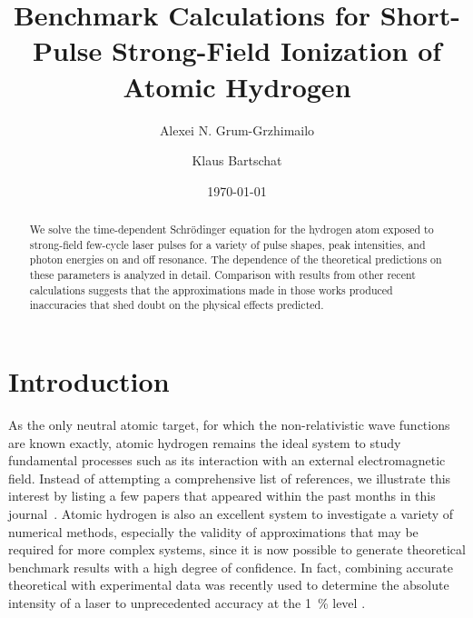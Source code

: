 \documentclass[12pt,aps,pra,amsmath,amssymb,showpacs,twocolumn,preprintnumbers,
floatfix,letterpaper]{revtex4-1}
\begin{document}

\author{Alexei N. Grum-Grzhimailo}

\author{Klaus Bartschat}

\date{\today}

\title{Benchmark Calculations for Short-Pulse Strong-Field Ionization of Atomic Hydrogen}

\begin{abstract}


We solve the time-dependent Schr\"odinger equation for the hydrogen atom exposed to strong-field few-cycle
laser pulses for a variety of pulse shapes, peak intensities, and photon energies on and off resonance.
The dependence of the theoretical predictions on these parameters is analyzed in detail. Comparison
with results from other recent calculations suggests that the approximations made in those
works produced inaccuracies that shed doubt on the physical effects predicted. 
 
\end{abstract}


\maketitle

\section{Introduction}\label{sec:intro}
As the only neutral atomic target, for which the non-relativistic wave functions are known exactly, atomic hydrogen remains the ideal system to study fundamental processes such as its interaction with an external electromagnetic field. Instead of attempting a comprehensive list of references, we illustrate this interest by listing a few papers that appeared within the past months in this journal~\cite{PhysRevA.87.013405,PhysRevA.87.013421,PhysRevA.87.043405,PhysRevA.87.043411}. Atomic hydrogen is also an excellent system to investigate a variety of numerical methods, especially the validity of approximations that may be required for more complex systems, since it is now possible to generate theoretical benchmark results with a high degree of confidence. In fact, combining accurate theoretical with experimental data was recently used to determine the absolute intensity of a laser to unprecedented accuracy at the 1~\% level \cite{PhysRevA.87.053411}.
\end{document}

